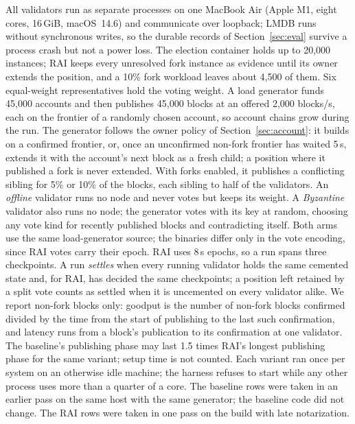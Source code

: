 All validators run as separate processes on one MacBook Air (Apple M1, eight cores, 16\,GiB, macOS~14.6) and communicate over loopback; LMDB runs without synchronous writes, so the durable records of Section~\ref{sec:eval} survive a process crash but not a power loss. The election container holds up to 20{,}000 instances; RAI keeps every unresolved fork instance as evidence until its owner extends the position, and a 10\% fork workload leaves about 4{,}500 of them. Six equal-weight representatives hold the voting weight. A load generator funds 45{,}000 accounts and then publishes 45{,}000 blocks at an offered 2{,}000 blocks/s, each on the frontier of a randomly chosen account, so account chains grow during the run. The generator follows the owner policy of Section~\ref{sec:account}: it builds on a confirmed frontier, or, once an unconfirmed non-fork frontier has waited 5\,s, extends it with the account's next block as a fresh child; a position where it published a fork is never extended. With forks enabled, it publishes a conflicting sibling for 5\% or 10\% of the blocks, each sibling to half of the validators. An \emph{offline} validator runs no node and never votes but keeps its weight. A \emph{Byzantine} validator also runs no node; the generator votes with its key at random, choosing any vote kind for recently published blocks and contradicting itself. Both arms use the same load-generator source; the binaries differ only in the vote encoding, since RAI votes carry their epoch. RAI uses 8\,s epochs, so a run spans three checkpoints. A run \emph{settles} when every running validator holds the same cemented state and, for RAI, has decided the same checkpoints; a position left retained by a split vote counts as settled when it is uncemented on every validator alike. We report non-fork blocks only: goodput is the number of non-fork blocks confirmed divided by the time from the start of publishing to the last such confirmation, and latency runs from a block's publication to its confirmation at one validator. The baseline's publishing phase may last 1.5 times RAI's longest publishing phase for the same variant; setup time is not counted. Each variant ran once per system on an otherwise idle machine; the harness refuses to start while any other process uses more than a quarter of a core. The baseline rows were taken in an earlier pass on the same host with the same generator; the baseline code did not change. The RAI rows were taken in one pass on the build with late notarization.



